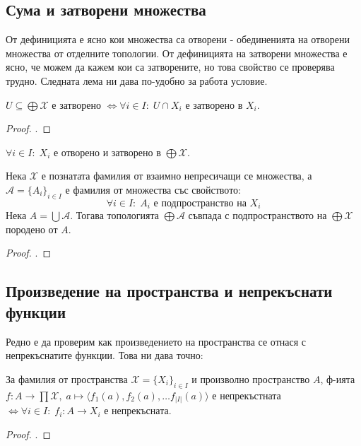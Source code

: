 \subsection{Сума и затворени множества}
От дефиницията е ясно кои множества са отворени - обединенията на отворени множества от отделните топологии. От дефиницията на затворени множества е ясно, че можем да кажем кои са затворените, но това свойство се проверява трудно. Следната лема ни дава по-удобно за работа условие.
\begin{lemma}
    $U \subseteq \bigoplus \mathcal X$ е затворено $\iff \forall i \in I:\; U \cap X_i$ е затворено в $X_i$.
\end{lemma}
\begin{proof}
    \cite[p.~74]{engelking1989general}.
\end{proof}

\begin{corollary}
    $\forall i \in I:\; X_i$ е отворено и затворено в $\bigoplus \mathcal X$.
\end{corollary}
\begin{proposition}
    Нека $\mathcal X$ е познатата фамилия от взаимно непресичащи се множества, а $\mathcal A = \{A_i\}_{i \in I}$ е фамилия от множества със свойството:
    \begin{equation*}
        \forall i\in I:\; A_i \text{ е подпространство на } X_i
    \end{equation*}
    Нека $A = \bigcup \mathcal A$. Тогава топологията $\bigoplus \mathcal A$ съвпада с подпространството на $\bigoplus \mathcal X$ породено от $A$.
\end{proposition}
\begin{proof}
    \cite[p.~75]{engelking1989general}.
\end{proof}

\subsection{Произведение на пространства и непрекъснати функции}
Редно е да проверим как произведението на пространства се отнася с непрекъснатите функции. Това ни дава точно:
\begin{theorem}\label{th:sum-continuous}
    За фамилия от пространства $\mathcal X = \{X_i\}_{i \in I}$ и произволно пространство $A$, ф-ията $f : A \to \prod \mathcal X,\; a \mapsto \langle f_1(a), f_2(a), \dots f_{|I|}(a) \rangle$ е непрекъстната $\iff \forall i \in I:\; f_i: A \to X_i$ е непрекъсната.
\end{theorem}
\begin{proof}
    \cite[p.~110]{munkrestopology}.
\end{proof}
